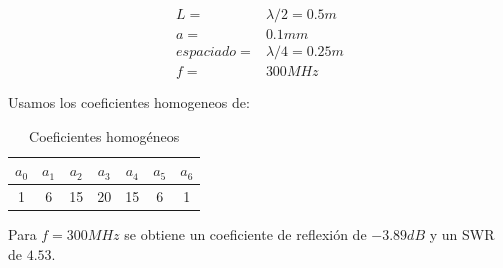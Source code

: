 \documentclass[11pt]{book}
\begin{document}
\begin{align*}
	L = &\lambda/2 =  0.5m \\
	a = & 0.1mm \\
	espaciado = & \lambda / 4 = 0.25m \\
	f = & 300MHz
\end{align*}

Usamos los coeficientes homogeneos de:
\begin{table}[!ht]
	\centering
	\begin{tabular}{c|c|c|c|c|c|c}
		$a_0$ & $a_1$ & $a_2$ & $a_3$ & $a_4$ & $a_5$ & $a_6$ \\ \hline
		1 & 6 & 15 & 20 & 15 & 6 & 1 \\
	\end{tabular}
	\caption{Coeficientes homogéneos}
	\label{tab:6}
\end{table}

Para $f=300MHz$ se obtiene un coeficiente de reflexión de $-3.89dB$ y un SWR de $4.53$. 
\end{document}
